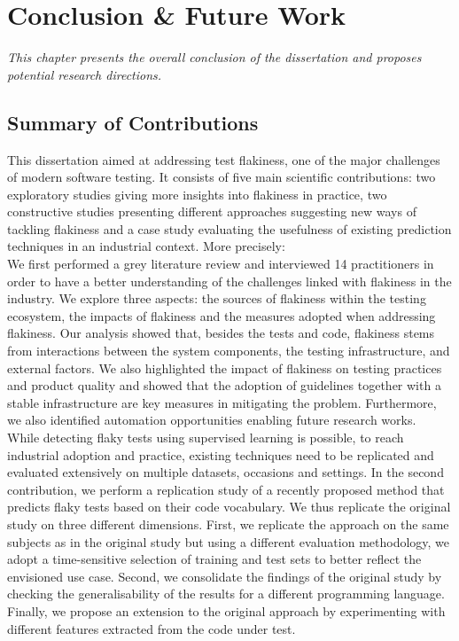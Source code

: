 \chapter{Conclusion \& Future Work}
\label{chap:conclusion}

\setcounter{minitocdepth}{1}
\justifying
\textit{
This chapter presents the overall conclusion of the dissertation and proposes potential research directions. 
}

\chapterPage{}

\section{Summary of Contributions}

 This dissertation aimed at addressing test flakiness, one of the major challenges of modern software testing. It consists of five main scientific contributions: two exploratory studies giving more insights into flakiness in practice, two constructive studies presenting different approaches suggesting new ways of tackling flakiness and a case study evaluating the usefulness of existing prediction techniques in an industrial context. More precisely:\\

 We first performed a grey literature review and interviewed 14 practitioners in order to have a better understanding of the challenges linked with flakiness in the industry. We explore three aspects: the sources of flakiness within the testing ecosystem, the impacts of flakiness and the measures adopted when addressing flakiness. Our analysis showed that, besides the tests and code, flakiness stems from interactions between the system components, the testing infrastructure, and external factors. We also highlighted the impact of flakiness on testing practices and product quality and showed that the adoption of guidelines together with a stable infrastructure are key measures in mitigating the problem. Furthermore, we also identified automation opportunities enabling future research works.\\
    
 While detecting flaky tests using supervised learning is possible, to reach industrial adoption and practice, existing techniques need to be replicated and evaluated extensively on multiple datasets, occasions and settings. In the second contribution, we perform a replication study of a recently proposed method that predicts flaky tests based on their code vocabulary. We thus replicate the original study on three different dimensions. First, we replicate the approach on the same subjects as in the original study but using a different evaluation methodology, \ie we adopt a time-sensitive selection of training and test sets to better reflect the envisioned use case. Second, we consolidate the findings of the original study by checking the generalisability of the results for a different programming language. Finally, we propose an extension to the original approach by experimenting with different features extracted from the code under test.\\
    
